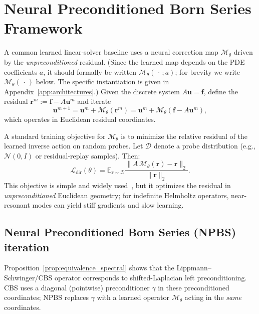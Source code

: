 \documentclass{article}
\providecommand{\E}{\mathbb{E}}
\theoremstyle{plain}
\theoremstyle{remark}
\begin{document}
\section{Neural Preconditioned Born Series Framework}
\label{sec:npbs}

A common learned linear-solver baseline uses a neural correction map $\mathcal{M}_\theta$ driven by the \emph{unpreconditioned} residual. (Since the learned map depends on the PDE coefficients $a$, it should formally be written $\mathcal{M}_\theta(\,\cdot\,;a)$; for brevity we write $\mathcal{M}_\theta(\,\cdot\,)$ below. The specific instantiation is given in Appendix~\ref{app:architectures}.)
Given the discrete system $A\bm u=\bm f$, define the residual $\bm r^m := \bm f - A\bm u^m$ and iterate
\begin{equation}
\bm u^{m+1} = \bm u^m + \mathcal{M}_\theta(\bm r^m)
= \bm u^m + \mathcal{M}_\theta(\bm f-A\bm u^m),
\label{eq:direct_iter}
\end{equation}
which operates in Euclidean residual coordinates.

A standard training objective for $\mathcal{M}_\theta$ is to minimize the relative residual of the learned inverse action on random probes. Let $\mathcal{D}$ denote a probe distribution (e.g., $\mathcal{N}(0,I)$ or residual-replay samples). Then:
\begin{equation}
\mathcal{L}_{\mathrm{dir}}(\theta)
=
\E_{\bm r\sim\mathcal{D}}
\frac{\|A\,\mathcal{M}_\theta(\bm r)-\bm r\|_2}{\|\bm r\|_2}.
\label{eq:L_dir}
\end{equation}
This objective is simple and widely used~\cite{cui2025neural,xie2025mgcfnn}, but it optimizes the residual in \emph{unpreconditioned} Euclidean geometry; for indefinite Helmholtz operators, near-resonant modes can yield stiff gradients and slow learning.

\subsection{Neural Preconditioned Born Series (NPBS) iteration}
\label{sec:npbs_iter}

Proposition~\ref{prop:equivalence_spectral} shows that the Lippmann--Schwinger/CBS operator corresponds to shifted-Laplacian left preconditioning.
CBS uses a diagonal (pointwise) preconditioner $\gamma$ in these preconditioned coordinates; NPBS replaces $\gamma$ with a learned operator $\mathcal{M}_\theta$ acting in the \emph{same} coordinates.
\end{document}
